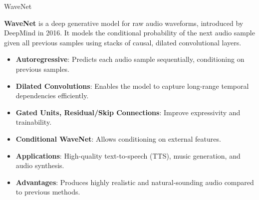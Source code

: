 \begin{frame}[allowframebreaks]{WaveNet}
    \framebreak

    \textbf{WaveNet} is a deep generative model for raw audio waveforms, introduced by DeepMind in 2016. It models the conditional probability of the next audio sample given all previous samples using stacks of causal, dilated convolutional layers.

    \begin{itemize}
        \item \textbf{Autoregressive}: Predicts each audio sample sequentially, conditioning on previous samples.
        \item \textbf{Dilated Convolutions}: Enables the model to capture long-range temporal dependencies efficiently.
        \item \textbf{Gated Units, Residual/Skip Connections}: Improve expressivity and trainability.
        \item \textbf{Conditional WaveNet}: Allows conditioning on external features.
        \item \textbf{Applications}: High-quality text-to-speech (TTS), music generation, and audio synthesis.
        \item \textbf{Advantages}: Produces highly realistic and natural-sounding audio compared to previous methods.
    \end{itemize}
\end{frame}